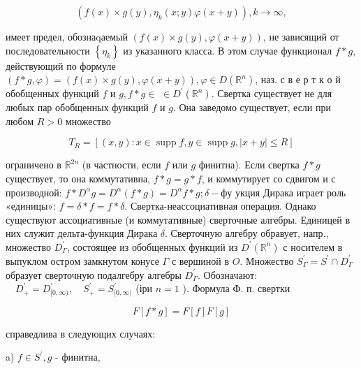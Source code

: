 \documentclass[10pt]{article}
\begin{document}
\[

\left(f(x) \times g(y), \eta_{k}(x ; y) \varphi(x+y)\right), k \longrightarrow \infty,

\]



имеет предел, обознаqаемый $(f(x) \times g(y), \varphi(x+y))$, не зависящий от последовательности $\left\{\eta_{k}\right\}$ из указанного класса. В этом случае функционал $f * g$, действующий по формуле $(f * g, \varphi)=(f(x) \times g(y), \varphi(x+y)), \varphi \in D\left(\mathbb{R}^{n}\right)$, наз. с в е р т к о й обобщенных функций $f$ и $g, f * g \in$ $\in D^{\prime}\left(\mathbb{R}^{n}\right)$. Свертка существует не для любых пар обобщенных функций $f$ и $g$. Она заведомо существует, если при любом $R>0$ множество



\[

T_{R}=[(x, y): x \in \operatorname{supp} f, y \in \operatorname{supp} g,|x+y| \leqslant R]

\]



ограничено в $\mathbb{R}^{2 n}$ (в частности, если $f$ или $g$ финитна). Если свертка $f * g$ существует, то она коммутативна, $f * g=g * f$, и коммутирует со сдвигом и с производной: $f * D^{\alpha} g=D^{\alpha}(f * g)=D^{\alpha} f * g ; \delta-ф у$ укция Дирака играет роль «единицы»: $f=\delta * f=f * \delta$. Свертка-неассоциативная операция. Однако существуют ассоциативные (и коммутативные) сверточные алгебры. Единицей в них служит дельта-функция Дирака $\delta$. Сверточную алгебру обравует, напр., множество $D_{\Gamma}^{\prime}$, состоящее из обобщенных функций из $D^{\prime}\left(\mathbb{R}^{n}\right)$ с носителем в выпуклом остром замкнутом конусе $\Gamma$ с вершиной в $O$. Множество $S_{\Gamma}^{\prime}=S^{\prime} \cap D_{\Gamma}^{\prime}$ образует сверточную подалгебру алгебры $D_{\Gamma}^{\prime}$. Обозначают: $\quad D_{+}^{\prime}=D_{[0, \infty)}^{\prime}, \quad S_{+}^{\prime}=S_{[0, \infty)}^{\prime}$ (іри $n=1$ ). Формула Ф. п. свертки



\[

F[f * g]=F[f] F[g]

\]



справедлива в следующих случаях:



a) $f \in S^{\prime}, g$ - финитна,
\end{document}
